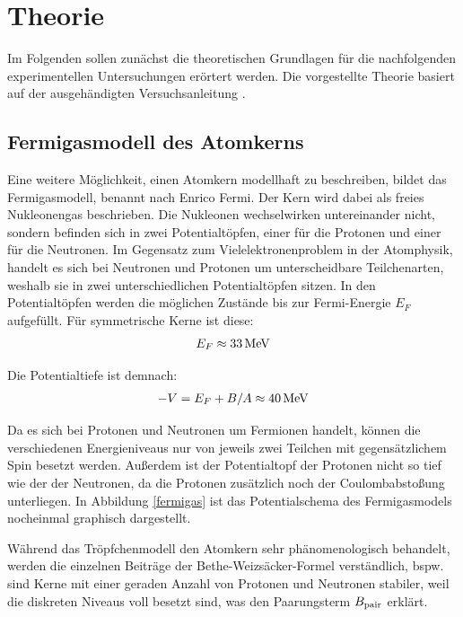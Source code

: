 \section{Theorie}
	
Im Folgenden sollen zunächst die theoretischen Grundlagen für die nachfolgenden experimentellen Untersuchungen erörtert werden.
Die vorgestellte Theorie basiert auf der ausgehändigten Versuchsanleitung \cite{wwu}.

\subsection{Fermigasmodell des Atomkerns}
Eine weitere Möglichkeit, einen Atomkern modellhaft zu beschreiben, bildet das Fermigasmodell, benannt nach Enrico Fermi. Der Kern wird dabei als freies Nukleonengas beschrieben. Die Nukleonen wechselwirken untereinander nicht, sondern befinden sich in zwei Potentialtöpfen, einer für die Protonen und einer für die Neutronen. Im Gegensatz zum Vielelektronenproblem in der Atomphysik, handelt es sich bei Neutronen und Protonen um unterscheidbare Teilchenarten, weshalb sie in zwei unterschiedlichen Potentialtöpfen sitzen. In den Potentialtöpfen werden die möglichen Zustände bis zur Fermi-Energie $E_F$ aufgefüllt. Für symmetrische Kerne ist diese:
\begin{align*}
E_F\approx 33\,\textnormal{MeV}
\end{align*}

\noindent Die Potentialtiefe ist demnach: 
\begin{align*}
-V=E_F+B/A\approx 40\,\textnormal{MeV}
\end{align*}

\noindent Da es sich bei Protonen und Neutronen um Fermionen handelt, können die verschiedenen Energieniveaus nur von jeweils zwei Teilchen mit gegensätzlichem Spin besetzt werden. Außerdem ist der Potentialtopf der Protonen nicht so tief wie der der Neutronen, da die Protonen zusätzlich noch der Coulombabstoßung unterliegen. In Abbildung \ref{fermigas} ist das Potentialschema des Fermigasmodels nocheinmal graphisch dargestellt.

Während das Tröpfchenmodell den Atomkern sehr phänomenologisch behandelt, werden die einzelnen Beiträge der Bethe-Weizsäcker-Formel verständlich, bspw. sind Kerne mit einer geraden Anzahl von Protonen und Neutronen stabiler, weil die diskreten Niveaus voll besetzt sind, was den Paarungsterm $B_{\textnormal{pair}}$ erklärt.

